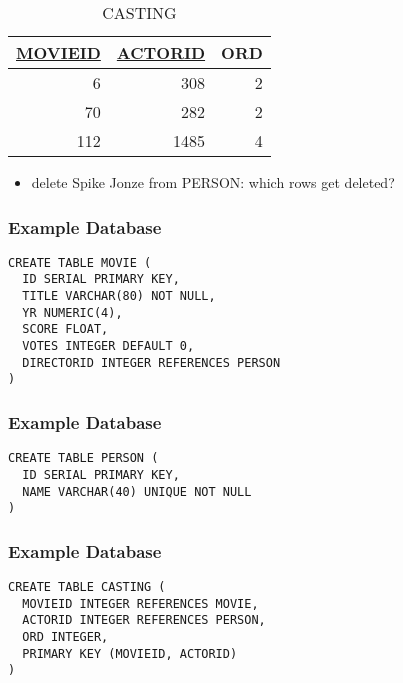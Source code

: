 \documentclass[dvipsnames]{beamer}
\theoremstyle{plain}
\begin{document}
\begin{frame}
  \vspace{-12pt}
  \begin{tiny}
  \begin{table}
    \caption{CASTING}
    \begin{tabular}{|r|r|r|}\hline
\underline{MOVIEID} & \underline{ACTORID} & ORD\\[2pt]\hline\hline
                  6 &                 308 &   2\\\hline
                 70 &                 282 &   2\\\hline
                112 &                1485 &   4\\\hline
    \end{tabular}
  \end{table}
  \end{tiny}

  \begin{itemize}
    \item delete Spike Jonze from PERSON: which rows get deleted?
  \end{itemize}
\end{frame}

\begin{frame}[fragile]
  \frametitle{Example Database}

  \begin{lstlisting}
CREATE TABLE MOVIE (
  ID SERIAL PRIMARY KEY,
  TITLE VARCHAR(80) NOT NULL,
  YR NUMERIC(4),
  SCORE FLOAT,
  VOTES INTEGER DEFAULT 0,
  DIRECTORID INTEGER REFERENCES PERSON
)
  \end{lstlisting}
\end{frame}

\begin{frame}[fragile]
  \frametitle{Example Database}

  \begin{lstlisting}
CREATE TABLE PERSON (
  ID SERIAL PRIMARY KEY,
  NAME VARCHAR(40) UNIQUE NOT NULL
)
  \end{lstlisting}
\end{frame}

\begin{frame}[fragile]
  \frametitle{Example Database}

  \begin{lstlisting}
CREATE TABLE CASTING (
  MOVIEID INTEGER REFERENCES MOVIE,
  ACTORID INTEGER REFERENCES PERSON,
  ORD INTEGER,
  PRIMARY KEY (MOVIEID, ACTORID)
)
  \end{lstlisting}
\end{frame}
\end{document}

